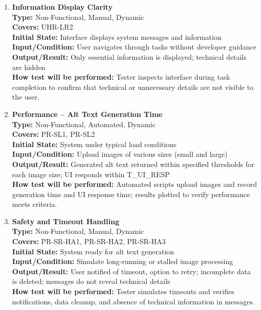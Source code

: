 \documentclass[12pt, titlepage]{article}
\begin{document}
\begin{enumerate}[label=NFR-ST \arabic*., wide=0pt, leftmargin=*]
  \item \textbf{Information Display Clarity} \\[2mm]
    \textbf{Type:} Non-Functional, Manual, Dynamic \\
    \textbf{Covers:} UHR-LR2 \\
    \textbf{Initial State:} Interface displays system messages and
    information \\
    \textbf{Input/Condition:} User navigates through tasks without
    developer guidance \\
    \textbf{Output/Result:} Only essential information is displayed;
    technical details are hidden \\[2mm]
    \textbf{How test will be performed:} Tester inspects interface
    during task completion to confirm that technical or unnecessary
    details are not visible to the user.

  \item \textbf{Performance – Alt Text Generation Time} \\[2mm]
    \textbf{Type:} Non-Functional, Automated, Dynamic \\
    \textbf{Covers:} PR-SL1, PR-SL2 \\
    \textbf{Initial State:} System under typical load conditions \\
    \textbf{Input/Condition:} Upload images of various sizes (small
    and large) \\
    \textbf{Output/Result:} Generated alt text returned within
    specified thresholds for each image size; UI responds within
    T\_UI\_RESP \\[2mm]
    \textbf{How test will be performed:} Automated scripts upload
    images and record generation time and UI response time; results
    plotted to verify performance meets criteria.

  \item \textbf{Safety and Timeout Handling} \\[2mm]
    \textbf{Type:} Non-Functional, Manual, Dynamic \\
    \textbf{Covers:} PR-SR-HA1, PR-SR-HA2, PR-SR-HA3 \\
    \textbf{Initial State:} System ready for alt text generation \\
    \textbf{Input/Condition:} Simulate long-running or stalled image
    processing \\
    \textbf{Output/Result:} User notified of timeout, option to
    retry; incomplete data is deleted; messages do not reveal
    technical details \\ [2mm]
    \textbf{How test will be performed:} Tester simulates timeouts
    and verifies notifications, data cleanup, and absence of
    technical information in messages.


\end{enumerate}
\end{document}
